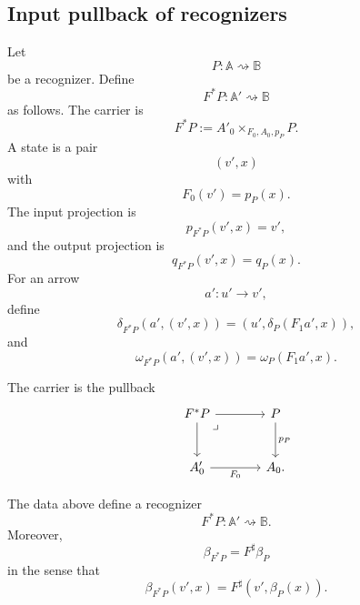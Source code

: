 \subsection{Input pullback of recognizers}
\label{subsec:input-pullback-recognizers}

\begin{definition}
\label{def:input-pullback-recognizer}
    Let
    \[
        P:\mathbb A\rightsquigarrow\mathbb B
    \]
    be a recognizer. Define
    \[
        F^*P:\mathbb A'\rightsquigarrow\mathbb B
    \]
    as follows. The carrier is
    \[
        F^*P
        :=
        A'_0\times_{F_0,A_0,p_P}P.
    \]
    A state is a pair
    \[
        (v',x)
    \]
    with
    \[
        F_0(v')=p_P(x).
    \]
    The input projection is
    \[
        p_{F^*P}(v',x)=v',
    \]
    and the output projection is
    \[
        q_{F^*P}(v',x)=q_P(x).
    \]
    For an arrow
    \[
        a':u'\to v',
    \]
    define
    \[
        \delta_{F^*P}(a',(v',x))
        =
        (u',\delta_P(F_1a',x)),
    \]
    and
    \[
        \omega_{F^*P}(a',(v',x))
        =
        \omega_P(F_1a',x).
    \]
\end{definition}

The carrier is the pullback
\[
\begin{tikzcd}[column sep=large, row sep=large]
    F^*P
        \arrow[r]
        \arrow[d]
        \arrow[dr, phantom, "\lrcorner", very near start]
    &
    P
        \arrow[d, "p_P"]
    \\
    A'_0
        \arrow[r, "F_0"']
    &
    A_0 .
\end{tikzcd}
\]

\begin{proposition}
\label{prop:input-pullback-recognizer}
    The data above define a recognizer
    \[
        F^*P:\mathbb A'\rightsquigarrow\mathbb B.
    \]
    Moreover,
    \[
        \beta_{F^*P}
        =
        F^\sharp\beta_P
    \]
    in the sense that
    \[
        \beta_{F^*P}(v',x)
        =
        F^\sharp(v',\beta_P(x)).
    \]
\end{proposition}

